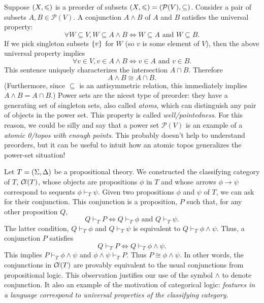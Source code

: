 \documentclass[../main.tex]{subfiles}
\begin{document}
\begin{example}
  Suppose \({\left(X,\leqslant\right)}\) is a preorder of subsets \({\left(X,\leqslant\right)} =
  {\left(\mathcal{P}(V),\subseteq\right)}\). Consider a pair of subsets \(A, B \in
  \mathcal{P}(V)\). A conjunction \(A \wedge B\) of \(A\) and \(B\) satisfies
  the universal property:
  \[%
    \forall W \subseteq V, W \subseteq A \wedge B \Leftrightarrow W \subseteq A
    \text{ and } W \subseteq B.
  \]%
  If we pick singleton subsets \({\left\{v\right\}}\) for \(W\) (so \(v\) is some element
  of \(V\)), then the above universal property implies
  \[%
    \forall v \in V, v \in A \wedge B \Leftrightarrow v \in A \text{ and } v \in
    B.
  \]%
  This sentence uniquely characterizes the intersection \(A \cap B\). Therefore
  \[%
    A \wedge B \cong A \cap B.
  \]%
  (Furthermore, since \(\subseteq\) is an antisymmetric relation, this
  immediately implies \(A \wedge B = A \cap B\).) Power sets are the nicest type
  of preorder: they have a generating set of singleton sets, also called
  \emph{atoms}, which can distinguish any pair of objects in the power set. This
  property is called \emph{well\-/pointedness}. For this reason, we could be
  silly and say that a power set \(\mathcal{P}(V)\) is an example of a
  \emph{atomic 0\-/topos with enough points}. This probably doesn't help to
  understand preorders, but it can be useful to intuit how an atomic topos
  generalizes the power-set situation!
\end{example}
\begin{example}
  Let \(T = {\left(\Sigma,\Delta\right)}\) be a propositional theory. We constructed
  the classifying category of \(T\), \({\mathcal{C}\kern-.15em\ell}(T)\), whose objects are propositions
  \(\phi\) in \(T\) and whose arrows \(\phi \to \psi\) correspond to sequents
  \(\phi \vdash_T \psi\). Given two propositions \(\phi\) and \(\psi\) of \(T\),
  we can ask for their conjunction. This conjunction is a proposition, \(P\)
  such that, for any other proposition \(Q\),
  \[%
    Q \vdash_T P \Leftrightarrow Q \vdash_T \phi \text{ and } Q \vdash_T \psi.
  \]%
  The latter condition, \(Q \vdash_T \phi\) and \(Q \vdash_T \psi\) is
  equivalent to \(Q \vdash_T \phi \wedge \psi\). Thus, a conjunction \(P\)
  satisfies
  \[%
    Q \vdash_T P \Leftrightarrow Q \vdash_T \phi \wedge \psi.
  \]%
  This implies \(P \vdash_T \phi \wedge \psi\) and \(\phi \wedge \psi \vdash_T
  P\). Thus \(P \cong \phi \wedge \psi\). In other words, the conjunctions in
  \({\mathcal{C}\kern-.15em\ell}{\left(T\right)}\) are provably equivalent to the usual conjunctions from
  propositional logic. This observation justifies our use of the symbol
  \(\wedge\) to denote conjunction. It also an example of the motivation of
  categorical logic: \emph{features in a language correspond to universal
    properties of the classifying category}.
\end{example}
\end{document}
